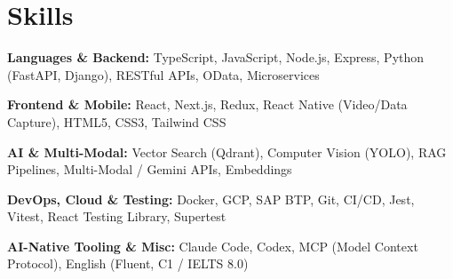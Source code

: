 \section{Skills}

\begin{onecolentry}
    \textbf{Languages \& Backend:} TypeScript, JavaScript, Node.js, Express, Python (FastAPI, Django), RESTful APIs, OData, Microservices
\end{onecolentry}

\vspace{0.06 cm}

\begin{onecolentry}
    \textbf{Frontend \& Mobile:} React, Next.js, Redux, React Native (Video/Data Capture), HTML5, CSS3, Tailwind CSS
\end{onecolentry}

\vspace{0.06 cm}

\begin{onecolentry}
    \textbf{AI \& Multi-Modal:} Vector Search (Qdrant), Computer Vision (YOLO), RAG Pipelines, Multi-Modal / Gemini APIs, Embeddings
\end{onecolentry}

\vspace{0.06 cm}

\begin{onecolentry}
    \textbf{DevOps, Cloud \& Testing:} Docker, GCP, SAP BTP, Git, CI/CD, Jest, Vitest, React Testing Library, Supertest
\end{onecolentry}

\vspace{0.06 cm}

\begin{onecolentry}
    \textbf{AI-Native Tooling \& Misc:} Claude Code, Codex, MCP (Model Context Protocol), English (Fluent, C1 / IELTS 8.0)
\end{onecolentry}

